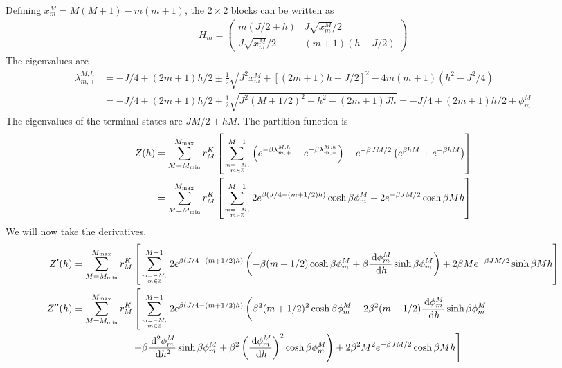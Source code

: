 \documentclass[12pt]{revtex4-2}
\begin{document}
Defining \(x^M_m = M(M+1) - m(m+1)\), the \(2\times 2\) blocks can be written as
\begin{align}
	H_m = \begin{pmatrix} m(J/2 + h) & J\sqrt{x^M_m}/2 \\ J\sqrt{x^M_m}/2 & (m+1)(h - J/2) \end{pmatrix} 
\end{align}
The eigenvalues are 
\begin{align}
	\lambda_{m, \pm}^{M, h} &= -J/4 + (2m+1)h/2 \pm \frac{1}{2}\sqrt{J^2x^M_m + \left[(2m+1)h - J/2\right]^2 - 4m(m+1)(h^2 - J^2/4)} \\
				&= -J/4 + (2m+1)h/2 \pm \frac{1}{2}\sqrt{J^2(M + 1/2)^2 + h^2 - (2m+1)Jh}	= -J/4 + (2m+1)h/2 \pm \phi^M_m
\end{align}
The eigenvalues of the terminal states are \(JM/2 \pm hM\). The partition function is
\begin{align}
	Z(h) &= \sum_{M=M_\text{min}}^{M_\text{max}}r^K_M\left[\sum_{m=-M, \atop{m\in \mathbb{Z}}}^{M-1}\left(e^{-\beta \lambda_{m, +}^{M, h}} + e^{-\beta \lambda_{m, -}^{M, h}}\right) + e^{-\beta JM/2}\left(e^{\beta hM} + e^{-\beta hM}\right)\right] \\
	     &=\sum_{M=M_\text{min}}^{M_\text{max}}r^K_M\left[\sum_{m=-M, \atop{m\in \mathbb{Z}}}^{M-1}2e^{\beta \left(J/4 - (m+1/2)h\right)}\cosh \beta\phi^M_m + 2e^{-\beta JM/2}\cosh \beta Mh\right]
\end{align}
We will now take the derivatives.
\begin{align}
	Z^\prime(h) &=\sum_{M=M_\text{min}}^{M_\text{max}}r^K_M\left[\sum_{m=-M, \atop{m\in \mathbb{Z}}}^{M-1}2e^{\beta \left(J/4 - (m+1/2)h\right)}\left(-\beta (m+1/2) \cosh \beta\phi^M_m + \beta\frac{\:\mathrm{d}\phi^M_m}{\:\mathrm{d}h}\sinh \beta\phi^M_m\right)+ 2\beta Me^{-\beta JM/2}\sinh \beta Mh\right]\\
	Z^{\prime\prime}(h) &=\sum_{M=M_\text{min}}^{M_\text{max}}r^K_M\left[\sum_{m=-M, \atop{m\in \mathbb{Z}}}^{M-1}2 e^{\beta \left(J/4 - (m+1/2)h\right)}\left(\beta^2 (m+1/2)^2 \cosh \beta\phi^M_m - 2\beta^2 (m+1/2)\frac{\:\mathrm{d}\phi^M_m}{\:\mathrm{d}h}\sinh \beta\phi^M_m\right.\right.\\
			    &\quad\quad\quad\quad\quad\quad\left.\left. + \beta\frac{\:\mathrm{d^2}\phi^M_m}{\:\mathrm{d}h^2}\sinh \beta\phi^M_m + \beta^2\left(\frac{\:\mathrm{d}\phi^M_m}{\:\mathrm{d}h}\right)^2 \cosh \beta\phi^M_m\right) + 2\beta^2 M^2 e^{-\beta JM/2}\cosh \beta Mh\right]\\
\end{align}
\end{document}
